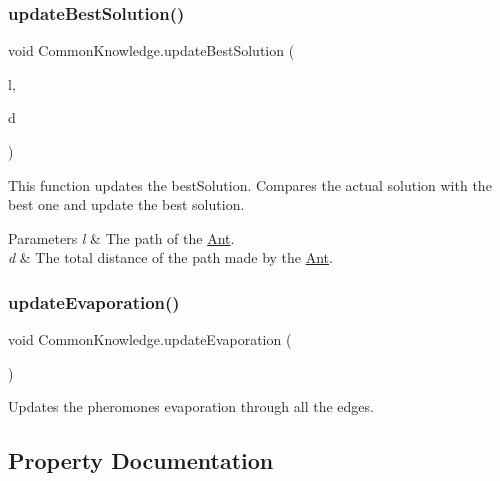 \subsubsection{\texorpdfstring{update\+Best\+Solution()}{updateBestSolution()}}
{\footnotesize\ttfamily void Common\+Knowledge.\+update\+Best\+Solution (\begin{DoxyParamCaption}\item[{List$<$ \hyperlink{classEdgeAntColonyData}{Edge\+Ant\+Colony\+Data} $>$}]{l,  }\item[{float}]{d }\end{DoxyParamCaption})\hspace{0.3cm}{\ttfamily [inline]}}



This function updates the best\+Solution. Compares the actual solution with the best one and update the best solution. 


\begin{DoxyParams}{Parameters}
{\em l} & The path of the \hyperlink{classAnt}{Ant}.\\
\hline
{\em d} & The total distance of the path made by the \hyperlink{classAnt}{Ant}.\\
\hline
\end{DoxyParams}
\mbox{\label{classCommonKnowledge_ac2325aee65d5cdc2ce638235000f71d9}} 
\subsubsection{\texorpdfstring{update\+Evaporation()}{updateEvaporation()}}
{\footnotesize\ttfamily void Common\+Knowledge.\+update\+Evaporation (\begin{DoxyParamCaption}{ }\end{DoxyParamCaption})\hspace{0.3cm}{\ttfamily [inline]}}



Updates the pheromones evaporation through all the edges. 



\subsection{Property Documentation}
\mbox{\label{classCommonKnowledge_a3a7589d86c441388b36cd87a92857a53}} 
